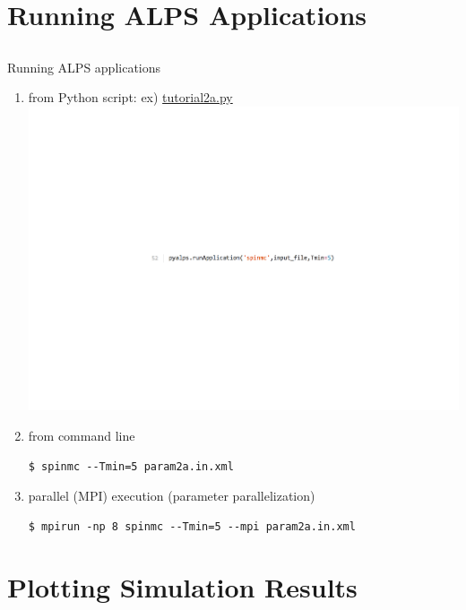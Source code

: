 \section{Running ALPS Applications}
\subsection*{\redb\blueb\greenb}

\begin{frame}[t,fragile]{Running ALPS applications}
  \begin{enumerate}
  \item from Python script: ex) \href{https://github.com/cmsi/alps-tutorial/blob/tutorials/tutorials/mc-02-susceptibilities/tutorial2a.py}{tutorial2a.py}
    \includegraphics[height=.08\textheight]{tutorial2a-2.pdf}
  \item from command line
\begin{lstlisting}
$ spinmc --Tmin=5 param2a.in.xml
\end{lstlisting}
  \item parallel (MPI) execution (parameter parallelization)
\begin{lstlisting}
$ mpirun -np 8 spinmc --Tmin=5 --mpi param2a.in.xml
\end{lstlisting}
  \end{enumerate}
\end{frame}

\section{Plotting Simulation Results}
\subsection*{\redb\blueb\greenb}

